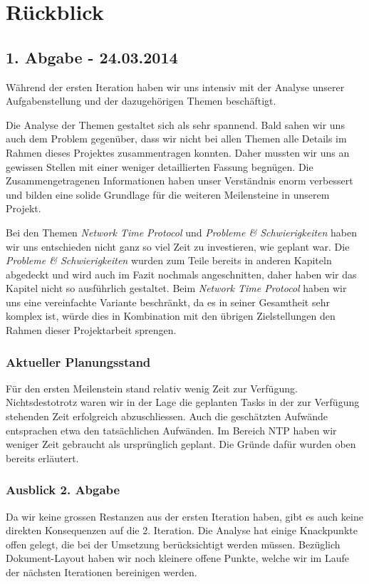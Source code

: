 \section{Rückblick}
\subsection{1. Abgabe - 24.03.2014}
Während der ersten Iteration haben wir uns intensiv mit der Analyse unserer Aufgabenstellung und der dazugehörigen Themen beschäftigt.

Die Analyse der Themen gestaltet sich als sehr spannend. Bald sahen wir uns auch dem Problem gegenüber, dass wir nicht bei allen Themen alle Details im Rahmen dieses Projektes zusammentragen konnten. Daher mussten wir uns an gewissen Stellen mit einer weniger detaillierten Fassung begnügen. Die Zusammengetragenen Informationen haben unser Verständnis enorm verbessert und bilden eine solide Grundlage für die weiteren Meilensteine in unserem Projekt.

Bei den Themen \textit{Network Time Protocol} und \textit{Probleme \& Schwierigkeiten} haben wir uns entschieden nicht ganz so viel Zeit zu investieren, wie geplant war. Die \textit{Probleme \& Schwierigkeiten} wurden zum Teile bereits in anderen Kapiteln abgedeckt und wird auch im Fazit nochmals angeschnitten, daher haben wir das Kapitel nicht so ausführlich gestaltet. Beim \textit{Network Time Protocol} haben wir uns eine vereinfachte Variante beschränkt, da es in seiner Gesamtheit sehr komplex ist, würde dies in Kombination mit den übrigen Zielstellungen den Rahmen dieser Projektarbeit sprengen.

\subsubsection{Aktueller Planungsstand}
Für den ersten Meilenstein stand relativ wenig Zeit zur Verfügung. Nichtsdestotrotz waren wir in der Lage die geplanten Tasks in der zur Verfügung stehenden Zeit erfolgreich abzuschliessen. Auch die geschätzten Aufwände entsprachen etwa den tatsächlichen Aufwänden. Im Bereich NTP haben wir weniger Zeit gebraucht als ursprünglich geplant. Die Gründe dafür wurden oben bereits erläutert.

\subsubsection{Ausblick 2. Abgabe}
Da wir keine grossen Restanzen aus der ersten Iteration haben, gibt es auch keine direkten Konsequenzen auf die 2. Iteration. Die Analyse hat einige Knackpunkte offen gelegt, die bei der Umsetzung berücksichtigt werden müssen. Bezüglich Dokument-Layout haben wir noch kleinere offene Punkte, welche wir im Laufe der nächsten Iterationen bereinigen werden.

